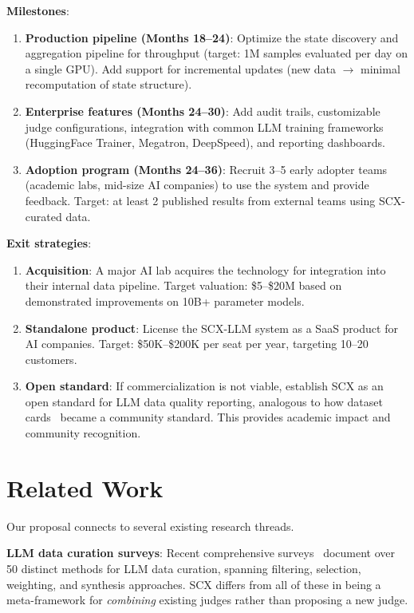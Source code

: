 \documentclass[11pt,twocolumn]{article}
\begin{document}
\textbf{Milestones}:
\begin{enumerate}
    \item \textbf{Production pipeline (Months 18--24)}: Optimize the state discovery and aggregation pipeline for throughput (target: 1M samples evaluated per day on a single GPU). Add support for incremental updates (new data $\rightarrow$ minimal recomputation of state structure).
    \item \textbf{Enterprise features (Months 24--30)}: Add audit trails, customizable judge configurations, integration with common LLM training frameworks (HuggingFace Trainer, Megatron, DeepSpeed), and reporting dashboards.
    \item \textbf{Adoption program (Months 24--36)}: Recruit 3--5 early adopter teams (academic labs, mid-size AI companies) to use the system and provide feedback. Target: at least 2 published results from external teams using SCX-curated data.
\end{enumerate}

\textbf{Exit strategies}:
\begin{enumerate}
    \item \textbf{Acquisition}: A major AI lab acquires the technology for integration into their internal data pipeline. Target valuation: \$5--\$20M based on demonstrated improvements on 10B+ parameter models.
    \item \textbf{Standalone product}: License the SCX-LLM system as a SaaS product for AI companies. Target: \$50K--\$200K per seat per year, targeting 10--20 customers.
    \item \textbf{Open standard}: If commercialization is not viable, establish SCX as an open standard for LLM data quality reporting, analogous to how dataset cards~\cite{gebru2021datasheets} became a community standard. This provides academic impact and community recognition.
\end{enumerate}

\section{Related Work}

Our proposal connects to several existing research threads.

\textbf{LLM data curation surveys}: Recent comprehensive surveys~\cite{long2024data,albalak2024survey,liang2024data} document over 50 distinct methods for LLM data curation, spanning filtering, selection, weighting, and synthesis approaches. SCX differs from all of these in being a meta-framework for \textit{combining} existing judges rather than proposing a new judge.
\end{document}

